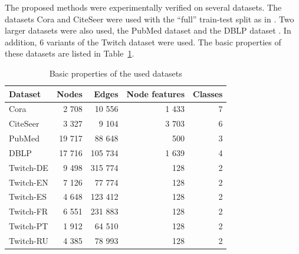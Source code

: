 \documentclass[sn-mathphys,pdflatex,iicol]{sn-jnl}%
\begin{document}
The proposed methods were experimentally verified on several datasets. The datasets Cora and CiteSeer \cite{yang_revisiting_2016} were used with the \enquote{full} train-test split as in \cite{chen_fastgcn_2018}. Two larger datasets were also used, the PubMed dataset \cite{yang_revisiting_2016} and the DBLP dataset \cite{bojchevski_deep_2018}. In addition, 6 variants of the Twitch dataset \cite{rozemberczki_multi-scale_2021} were used. The basic properties of these datasets are listed in Table~\ref{tab:dataset-sizes}.

\begin{table}
  \begin{center}
    \begin{minipage}{280pt} %
      \caption{Basic properties of the used datasets}
      \label{tab:dataset-sizes}
      \begin{tabular}{lrrrr}
        \toprule
        \textbf{Dataset} & \textbf{Nodes} & \textbf{Edges} & \textbf{Node features} & \textbf{Classes} \\
        \midrule
        Cora             & 2 708          & 10 556         & 1 433                  & 7                \\
        CiteSeer         & 3 327          & 9 104          & 3 703                  & 6                \\
        PubMed           & 19 717         & 88 648         & 500                    & 3                \\
        DBLP             & 17 716         & 105 734        & 1 639                  & 4                \\
        Twitch-DE        & 9 498          & 315 774        & 128                    & 2                \\
        Twitch-EN        & 7 126          & 77 774         & 128                    & 2                \\
        Twitch-ES        & 4 648          & 123 412        & 128                    & 2                \\
        Twitch-FR        & 6 551          & 231 883        & 128                    & 2                \\
        Twitch-PT        & 1 912          & 64 510         & 128                    & 2                \\
        Twitch-RU        & 4 385          & 78 993         & 128                    & 2                \\
        \bottomrule
      \end{tabular}
    \end{minipage}
  \end{center}
\end{table}
\end{document}
